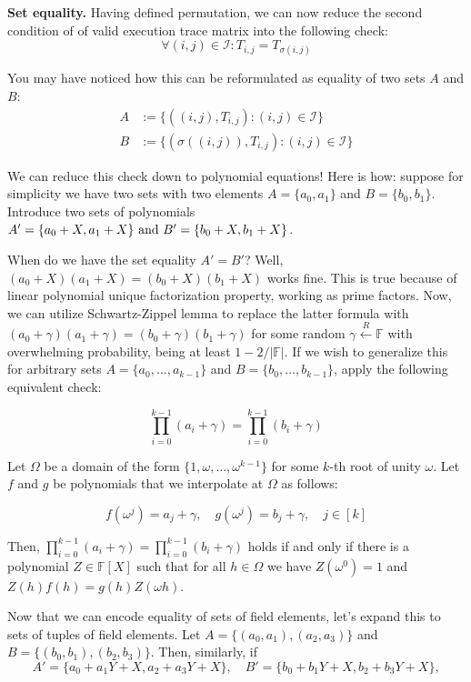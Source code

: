 \documentclass[../lecture-notes.tex]{subfiles}
\begin{document}
\textbf{Set equality.} Having defined permutation, we can now reduce the second
condition of  of valid execution trace matrix into
the following check:
\[\forall (i, j) \in \mathcal{I}: T_{i,j} = T_{\sigma(i,j)}\]

You may have noticed how this can be reformulated as equality of two sets $A$ and $B$:
\begin{align*}
    A &:= \{((i, j), T_{i,j}) : (i, j) \in \mathcal{I}\} \\
    B &:= \{(\sigma((i, j)), T_{i,j}) : (i, j) \in \mathcal{I}\}
\end{align*}

We can reduce this check down to polynomial equations! Here is how: suppose for
simplicity we have two sets with two elements \(A = \{a_0, a_1\}\) and \(B =
\{b_0, b_1\}\). Introduce two sets of polynomials \(A' = \{a_0 + X, a_1 +
X\}$ and $B' = \{b_0 + X, b_1 + X\}\). 

When do we have the set equality \(A' = B'\)? Well, \((a_0 + X)(a_1 + X) = (b_0
+ X)(b_1 + X)\) works fine. This is true because of linear polynomial unique
factorization property, working as prime factors. Now, we can utilize
Schwartz-Zippel lemma to replace the latter formula with \((a_0 + \gamma)(a_1 +
\gamma) = (b_0 + \gamma)(b_1 + \gamma)\) for some random $\gamma \xleftarrow{R}
\mathbb{F}$ with overwhelming probability, being at least $1-2/|\mathbb{F}|$. If we
wish to generalize this for arbitrary sets \(A = \{a_0, \ldots, a_{k-1}\}\) and
\(B = \{b_0, \ldots, b_{k-1}\}\), apply the following equivalent check:

\[\prod_{i=0}^{k-1} (a_i + \gamma) = \prod_{i=0}^{k-1} (b_i + \gamma)\]

Let $\Omega$ be a domain of the form \(\{1, \omega, \dots, \omega^{k-1}\}\) for
some $k$-th root of unity $\omega$. Let $f$ and $g$ be polynomials that we
interpolate at $\Omega$ as follows:

\begin{equation*}
    f(\omega^j) = a_j + \gamma, \quad g(\omega^j) = b_j + \gamma, \quad j \in [k]
\end{equation*}

Then, \(\prod_{i=0}^{k-1} (a_i + \gamma) = \prod_{i=0}^{k-1} (b_i + \gamma)\) holds if and only if there is a polynomial $Z \in \mathbb{F}[X]$ such that for all $h \in \Omega$ we have $Z(\omega^{0}) = 1$ and $Z(h)f(h) = g(h)Z(\omega h)$.

Now that we can encode equality of sets of field elements, let's expand this to sets of tuples of field elements. Let \(A = \{(a_0, a_1), (a_2, a_3)\}\) and \(B = \{(b_0, b_1), (b_2, b_3)\}\). Then, similarly, if
\[A' = \{a_0 + a_1Y + X, a_2 + a_3Y + X\}, \quad B' = \{b_0 + b_1Y + X, b_2 + b_3Y + X\},\]
\end{document}
